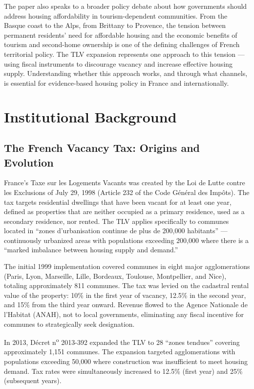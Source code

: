 \documentclass[12pt]{article}
\begin{document}
The paper also speaks to a broader policy debate about how governments should address housing affordability in tourism-dependent communities. From the Basque coast to the Alps, from Brittany to Provence, the tension between permanent residents' need for affordable housing and the economic benefits of tourism and second-home ownership is one of the defining challenges of French territorial policy. The TLV expansion represents one approach to this tension --- using fiscal instruments to discourage vacancy and increase effective housing supply. Understanding whether this approach works, and through what channels, is essential for evidence-based housing policy in France and internationally.

\section{Institutional Background}

\subsection{The French Vacancy Tax: Origins and Evolution}

France's Taxe sur les Logements Vacants was created by the Loi de Lutte contre les Exclusions of July 29, 1998 (Article 232 of the Code G\'en\'eral des Imp\^ots). The tax targets residential dwellings that have been vacant for at least one year, defined as properties that are neither occupied as a primary residence, used as a secondary residence, nor rented. The TLV applies specifically to communes located in ``zones d'urbanisation continue de plus de 200,000 habitants'' --- continuously urbanized areas with populations exceeding 200,000 where there is a ``marked imbalance between housing supply and demand.''

The initial 1999 implementation covered communes in eight major agglomerations (Paris, Lyon, Marseille, Lille, Bordeaux, Toulouse, Montpellier, and Nice), totaling approximately 811 communes. The tax was levied on the cadastral rental value of the property: 10\% in the first year of vacancy, 12.5\% in the second year, and 15\% from the third year onward. Revenue flowed to the Agence Nationale de l'Habitat (ANAH), not to local governments, eliminating any fiscal incentive for communes to strategically seek designation.

In 2013, D\'ecret n\textsuperscript{o} 2013-392 expanded the TLV to 28 ``zones tendues'' covering approximately 1,151 communes. The expansion targeted agglomerations with populations exceeding 50,000 where construction was insufficient to meet housing demand. Tax rates were simultaneously increased to 12.5\% (first year) and 25\% (subsequent years).
\end{document}

